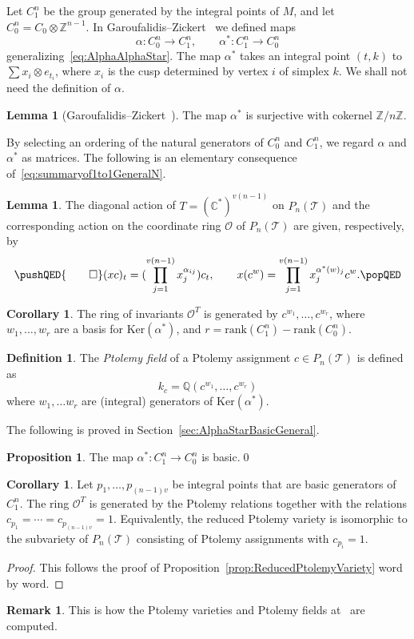 \documentclass[12pt]{amsart}
\theoremstyle{definition}
\newtheorem{proposition}[theorem]{Proposition}
\newtheorem{lemma}[theorem]{Lemma}
\newtheorem{definition}[theorem]{Definition}
\newtheorem{remark}[theorem]{Remark}
\newtheorem{corollary}[theorem]{Corollary}
\numberwithin{equation}{section}
\def\Z{\mathbb{Z}}
\def\C{\mathbb{C}}
\def\Q{\mathbb{Q}}
\def\T{\mathcal{T}}
\def\Ker{\mathrm{Ker}}
\def\rank{\mathrm{rank}}
\begin{document}
Let $C_1^n$ be the group generated by the integral points of $M$, and let $C^n_0=C_0\otimes \Z^{n-1}$. In Garoufalidis--Zickert~\cite{GaroufalidisZickert} we defined maps
\begin{equation}
\alpha\colon C^n_0\to C^n_1,\qquad \alpha^*\colon C^n_1\to C^n_0
\end{equation}
generalizing~\eqref{eq:AlphaAlphaStar}. The map $\alpha^*$ takes an integral point $(t,k)$ to $\sum x_i\otimes e_{t_i}$, where $x_i$ is the cusp determined by vertex $i$ of simplex $k$. We shall not need the definition of $\alpha$.
\begin{lemma}[Garoufalidis--Zickert~\cite{GaroufalidisZickert}]\label{lemma:CokernelN}
The map $\alpha^*$ is surjective with cokernel $\Z/n\Z$.
\end{lemma}
By selecting an ordering of the natural generators of $C^n_0$ and $C^n_1$, we regard $\alpha$ and $\alpha^*$ as matrices. The following is an elementary consequence of~\eqref{eq:summaryof1to1GeneralN}.
\begin{lemma}\label{lemma:ActionOnPtolemy}
The diagonal action of $T=(\C^*)^{v(n-1)}$ on $P_n(\T)$ and the corresponding action on the coordinate ring $\mathcal O$ of $P_n(\T)$ are given, respectively, by 
\begin{equation}
\pushQED{\qed}
(xc)_t=(\prod_{j=1}^{v(n-1)} x_j^{\alpha_{ij}})c_t,\qquad x(c^w)=\prod_{j=1}^{v(n-1)} x_j^{\alpha^*(w)_j}c^w.\qedhere
\popQED
\end{equation}
\end{lemma}
\begin{corollary} The ring of invariants $\mathcal O^T$ is generated by $c^{w_1},\dots,c^{w_r}$, where $w_1,\dots,w_r$ are a basis for $\Ker(\alpha^*)$, and $r=\rank(C^n_1)-\rank(C^n_0)$.
\end{corollary}
\begin{definition}
The \emph{Ptolemy field} of a Ptolemy assignment $c\in P_n(\T)$ is defined as
\begin{equation}
k_c=\Q(c^{w_1},\dots,c^{w_r})
\end{equation}
where $w_1,\dots w_r$ are (integral) generators of $\Ker(\alpha^*)$. 
\end{definition}
The following is proved in Section~\ref{sec:AlphaStarBasicGeneral}.
\begin{proposition}
The map $\alpha^*\colon C^n_1\to C^n_0$ is basic.\qed
\end{proposition}
\begin{corollary}
Let $p_1,\dots,p_{(n-1)v}$ be integral points that are basic generators of $C^n_1$. The ring $\mathcal O^T$ is generated by the Ptolemy relations together with the relations $c_{p_1}=\cdots=c_{p_{(n-1)v}}=1$. Equivalently, the reduced Ptolemy variety is isomorphic to the subvariety of $P_n(\T)$ consisting of Ptolemy assignments with $c_{p_i}=1$.
\end{corollary}
\begin{proof}
This follows the proof of Proposition~\ref{prop:ReducedPtolemyVariety} word by word.
\end{proof}
\begin{remark}
This is how the Ptolemy varieties and Ptolemy fields at~\cite{Unhyperbolic} are computed.
\end{remark}
\end{document}
